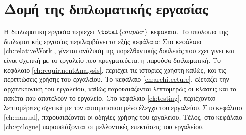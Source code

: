 \section{Δομή της διπλωματικής εργασίας}
\label{sec:Structure}
Η διπλωματική εργασία περιέχει $\total{chapter}$ κεφάλαια. Το υπόλοιπο της  διπλωματικής  εργασίας  περιλαμβάνει τα εξής κεφάλαια:
Στο κεφάλαιο \ref{ch:relativeWork}, γίνεται ανάλυση της παρελθοντικής δουλειάς που έχει γίνει και είναι σχετική με
το εργαλείο που πραγματεύεται η παρούσα διπλωματική. Το κεφάλαιο \ref{ch:requirmentAnalysis}, περιέχει τις ιστορίες χρήστη
καθώς, και τις περιπτώσεις χρήσης του εργαλείου. 
Το κεφάλαιο \ref{ch:architecture}, εξετάζει την αρχιτεκτονική του εργαλείου, 
καθώς παρουσιάζονται λεπτομερώς οι κλάσεις και τα πακέτα που αποτελούν το εργαλείο. Στο κεφάλαιο \ref{ch:testing}, περιέχονται 
λεπτομέρειες σχετικά με τον αυτοματοποιημένο έλεγχο του εργαλείου. Στο κεφάλαιο \ref{ch:manual}, παρουσιάζονται 
οι οδηγίες χρήσης του εργαλείου. Τέλος, στο κεφάλαιο \ref{ch:epilogue} παρουσιάζονται οι μελλοντικές επεκτάσεις του εργαλείου.
